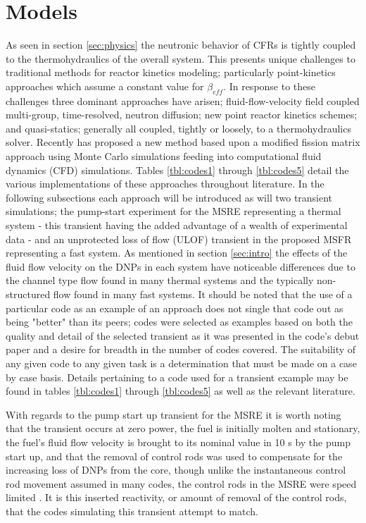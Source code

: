 \documentclass[review]{elsarticle}
\begin{document}
\section{Models} \label{sec:models}
As seen in section \ref{sec:physics} the neutronic behavior of CFRs is tightly
coupled to the thermohydraulics of the overall system. This presents unique
challenges to traditional methods for reactor kinetics modeling; particularly
point-kinetics approaches which assume a constant value for $\beta_{eff}$. In
response to these challenges three dominant approaches have arisen; 
fluid-flow-velocity field coupled multi-group, time-resolved, neutron diffusion;
new point reactor kinetics schemes; and quasi-statics; generally all coupled, tightly
or loosely, to a thermohydraulics solver. Recently
\cite{laureau_coupled_2015} has proposed a new method based upon a modified
fission matrix approach using Monte Carlo simulations feeding into
computational fluid dynamics (CFD) simulations. Tables \ref{tbl:codes1}
through \ref{tbl:codes5} detail
the various implementations of these approaches throughout literature.
In the following subsections
each approach will be introduced as will two transient simulations; the pump-start
experiment for the MSRE representing a thermal system - this transient having
the added advantage of a wealth of experimental data - and an unprotected loss
of flow (ULOF) transient in the proposed MSFR representing a fast system.
As mentioned in
section \ref{sec:intro} the effects of the fluid flow velocity on the DNPs in each
system have noticeable differences due to the channel type flow found in many
thermal systems and the typically non-structured flow found in many fast
systems.
It should be noted that the use of a particular code as an example of an
approach does not single that code out as being "better" than its peers; codes
were selected as examples based on both the quality and detail of the selected
transient as it was presented in the code's debut paper and a desire for breadth in the number of codes covered. The suitability of any given code to any given task
is a determination that must be made on a case by case basis. Details pertaining
to a code used for a transient example may be found in tables \ref{tbl:codes1}
through \ref{tbl:codes5} as
well as the relevant literature.
\par With regards to the pump start up transient for the MSRE it is worth noting
that the transient occurs at zero power, the fuel is initially molten and
stationary, the fuel's fluid flow velocity is brought to its nominal value in
10 s by the pump start up, and that the removal of control rods was used to
compensate for the increasing loss of DNPs from the core, though unlike the
instantaneous control rod movement assumed in many codes, 
the control rods in the
MSRE were speed limited \cite{krepel_dyn3d-msr_2007}. It is this inserted
reactivity, or amount of removal of the control rods, that the codes simulating
this transient attempt to match.
\end{document}
